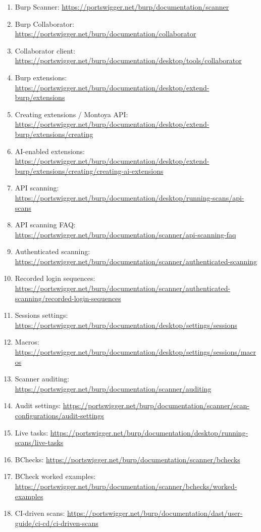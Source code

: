 \documentclass[11pt]{article}
\begin{document}
\begin{enumerate}
  \item Burp Scanner: \url{https://portswigger.net/burp/documentation/scanner}
  \item Burp Collaborator: \url{https://portswigger.net/burp/documentation/collaborator}
  \item Collaborator client: \url{https://portswigger.net/burp/documentation/desktop/tools/collaborator}
  \item Burp extensions: \url{https://portswigger.net/burp/documentation/desktop/extend-burp/extensions}
  \item Creating extensions / Montoya API: \url{https://portswigger.net/burp/documentation/desktop/extend-burp/extensions/creating}
  \item AI-enabled extensions: \url{https://portswigger.net/burp/documentation/desktop/extend-burp/extensions/creating/creating-ai-extensions}
  \item API scanning: \url{https://portswigger.net/burp/documentation/desktop/running-scans/api-scans}
  \item API scanning FAQ: \url{https://portswigger.net/burp/documentation/scanner/api-scanning-faq}
  \item Authenticated scanning: \url{https://portswigger.net/burp/documentation/scanner/authenticated-scanning}
  \item Recorded login sequences: \url{https://portswigger.net/burp/documentation/scanner/authenticated-scanning/recorded-login-sequences}
  \item Sessions settings: \url{https://portswigger.net/burp/documentation/desktop/settings/sessions}
  \item Macros: \url{https://portswigger.net/burp/documentation/desktop/settings/sessions/macros}
  \item Scanner auditing: \url{https://portswigger.net/burp/documentation/scanner/auditing}
  \item Audit settings: \url{https://portswigger.net/burp/documentation/scanner/scan-configurations/audit-settings}
  \item Live tasks: \url{https://portswigger.net/burp/documentation/desktop/running-scans/live-tasks}
  \item BChecks: \url{https://portswigger.net/burp/documentation/scanner/bchecks}
  \item BCheck worked examples: \url{https://portswigger.net/burp/documentation/scanner/bchecks/worked-examples}
  \item CI-driven scans: \url{https://portswigger.net/burp/documentation/dast/user-guide/ci-cd/ci-driven-scans}

\end{enumerate}
\end{document}
